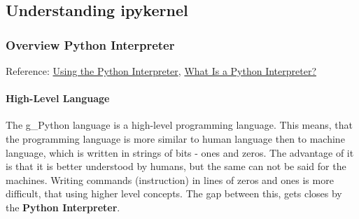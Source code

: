 
\subsection{Understanding ipykernel}
\subsubsection{Overview Python Interpreter}
Reference: \href{https://docs.python.org/3/tutorial/interpreter.html#the-interpreter-and-its-environment}{Using the Python Interpreter}, \href{https://blog.hubspot.com/website/what-is-python-interpreter#:~:text=A%20python%20interpreter%20is%20a,and%20low%2Dlevel%20languages%20are.}{What Is a Python Interpreter?}\\


\paragraph{High-Level Language}
The \gls{g_Python} language is a high-level programming language. This means, that the programming language is more similar to human language then to machine language, which is written in strings of bits - ones and zeros.
The advantage of it is that it is better understood by humans, but the same can not be said for the machines. Writing commands (instruction) in lines of zeros and ones is more difficult, that using higher level concepts. The gap between this, gets closes by the \textbf{Python Interpreter}.\\

